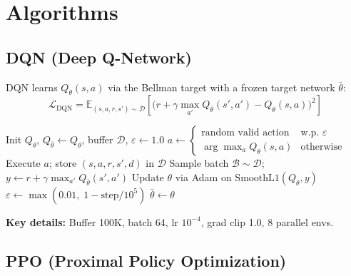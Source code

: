 \documentclass[conference, 10pt]{IEEEtran}
\begin{document}

\section{Algorithms}
\label{sec:algorithms}

\subsection{DQN (Deep Q-Network)}
\label{sec:dqn}

DQN learns $Q_\theta(s,a)$ via the Bellman target with a frozen target network $\bar{\theta}$:
\begin{equation}
\mathcal{L}_{\text{DQN}}=\mathbb{E}_{(s,a,r,s')\sim\mathcal{D}}\!\left[\bigl(r+\gamma\max_{a'}Q_{\bar{\theta}}(s',a')-Q_\theta(s,a)\bigr)^{2}\right]
\end{equation}

\begin{algorithm}[h]
\caption{DQN Training Loop}
\label{alg:dqn}
\begin{algorithmic}[1]
\small
\State Init $Q_\theta$, $Q_{\bar\theta} \leftarrow Q_\theta$, buffer $\mathcal{D}$, $\varepsilon \leftarrow 1.0$
    \State $a \leftarrow \begin{cases} \text{random valid action} & \text{w.p. } \varepsilon \\ \arg\max_a Q_\theta(s,a) & \text{otherwise}\end{cases}$
    \State Execute $a$; store $(s,a,r,s',d)$ in $\mathcal{D}$
    \State Sample batch $\mathcal{B} \sim \mathcal{D}$;\; $y \leftarrow r + \gamma \max_{a'} Q_{\bar\theta}(s',a')$
    \State Update $\theta$ via Adam on $\text{SmoothL1}(Q_\theta, y)$
    \State $\varepsilon \leftarrow \max(0.01,\; 1 - \text{step}/10^5)$
     $\bar\theta \leftarrow \theta$ \EndIf
\EndFor
\end{algorithmic}
\end{algorithm}

\textbf{Key details:} Buffer 100K, batch 64, lr $10^{-4}$, grad clip 1.0, 8 parallel envs.

\subsection{PPO (Proximal Policy Optimization)}
\end{document}
